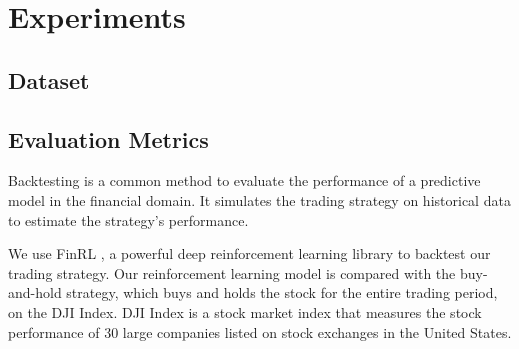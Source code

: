 \documentclass[conference]{IEEEtran}
\begin{document}

\section{Experiments}

\subsection{Dataset}


\subsection{Evaluation Metrics}

Backtesting is a common method to evaluate the performance of a predictive model in the financial domain.
It simulates the trading strategy on historical data to estimate the strategy's performance.

We use FinRL \cite{liu2022finrldeepreinforcementlearning}, a powerful deep reinforcement learning library to backtest our trading strategy.
Our reinforcement learning model is compared with the buy-and-hold strategy, which buys and holds the stock for the entire trading period, on the DJI Index.
DJI Index is a stock market index that measures the stock performance of 30 large companies listed on stock exchanges in the United States.
\end{document}
